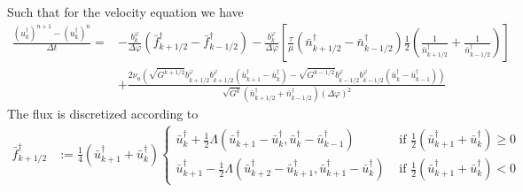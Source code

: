 Such that for the velocity equation we have
\begin{align}
    \frac{(u_k^\dagger)^{n+1}-(u_k^\dagger)^{n}}{\Delta t} = &- \frac{b^\varphi_k}{\Delta
    \varphi} \left( \bar f^\dagger_{k+1/2} -\bar f^\dagger_{k-1/2}\right) -\frac{b^\varphi_k}{\Delta\varphi}
        \left[\frac{\tau}{\mu} \left(\bar n^\dagger_{k+1/2} - \bar n^\dagger_{k-1/2}\right) \frac{1}{2}\left(\frac{1}{\bar n^\dagger_{k+1/2}}
    +\frac{1}{\bar n^\dagger_{k-1/2}}\right)\right]
    \nonumber\\
    &+ \frac{2\nu_u
        \left(\sqrt{G^{k+1/2}}b^\varphi_{k+1/2}b^\varphi_{k+1/2} (\bar u^\dagger_{k+1} - \bar u^\dagger_k)
        - \sqrt{G^{k-1/2}}b^\varphi_{k-1/2}b^\varphi_{k-1/2} (\bar u^\dagger_k - \bar u^\dagger_{k-1})\right)
    }{\sqrt{G^k}(\bar n^\dagger_{k+1/2} + \bar n^\dagger_{k-1/2}) (\Delta \varphi)^2}
\end{align}
The flux is discretized according to
\begin{align}
    \bar f^\dagger_{k+1/2} &:= \frac{1}{4}(\bar u^\dagger_{k+1}+\bar u^\dagger_k)
    \begin{cases}
        \bar u^\dagger_{k} + \frac{1}{2}\Lambda\left( \bar u^\dagger_{k+1} - \bar u^\dagger_k, \bar u^\dagger_k - \bar u^\dagger_{k-1}\right)&
        \text{ if } \frac{1}{2}(\bar u^\dagger_{k+1}+\bar u^\dagger_k) \geq 0 \\
        \bar u^\dagger_{k+1}   - \frac{1}{2}\Lambda\left( \bar u^\dagger_{k+2} - \bar u^\dagger_{k+1}, \bar u^\dagger_{k+1} -\bar u^\dagger_k \right) &
        \text{ if } \frac{1}{2}(\bar u^\dagger_{k+1}+\bar u^\dagger_k) < 0
    \end{cases}
\end{align}
